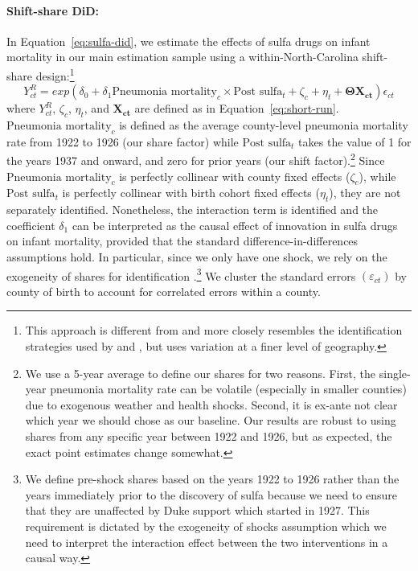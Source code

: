 \documentclass[12pt]{article}
\begin{document}
\paragraph{Shift-share DiD:}
In Equation~\ref{eq:sulfa-did}, we estimate the effects of sulfa drugs on infant mortality in our main estimation sample using a within-North-Carolina shift-share design:\footnote{This approach is different from  and more closely resembles the identification strategies used by  and , but uses variation at a finer level of geography.}
\begin{equation}
    Y^{R}_{ct} = exp(\delta_0 + \delta_1{\text{Pneumonia mortality}_{c} \times \text{Post sulfa}_{t}} + \zeta_c + \eta_t + \boldsymbol{\Theta} \mathbf{X_{ct}})\epsilon_{ct} \label{eq:sulfa-did}
\end{equation}
\noindent where $Y^{R}_{ct}$, $\zeta_c$, $\eta_t$, and $\mathbf{X_{ct}}$ are defined as in Equation~\ref{eq:short-run}.
$\text{Pneumonia mortality}_{c}$ is defined as the average county-level pneumonia mortality rate from 1922 to 1926 (our share factor) while $\text{Post sulfa}_{t}$ takes the value of 1 for the years 1937 and onward, and zero for prior years (our shift factor).\footnote{We use a 5-year average to define our shares for two reasons.
First, the single-year pneumonia mortality rate can be volatile (especially in smaller counties) due to exogenous weather and health shocks.
Second, it is ex-ante not clear which year we should chose as our baseline.
Our results are robust to using shares from any specific year between 1922 and 1926, but as expected, the exact point estimates change somewhat.} Since $\text{Pneumonia mortality}_{c}$ is perfectly collinear with county fixed effects ($\zeta_c$), while $\text{Post sulfa}_{t}$ is perfectly collinear with birth cohort fixed effects ($\eta_t$), they are not separately identified.
Nonetheless, the interaction term is identified and the coefficient $\delta_1$ can be interpreted as the causal effect of innovation in sulfa drugs on infant mortality, provided that the standard difference-in-differences assumptions hold.
In particular, since we only have one shock, we rely on the exogeneity of shares for identification .\footnote{
We define pre-shock shares based on the years 1922 to 1926 rather than the years immediately prior to the discovery of sulfa because we need to ensure that they are unaffected by Duke support which started in 1927.
This requirement is dictated by the exogeneity of shocks assumption which we need to interpret the interaction effect between the two interventions in a causal way.
}
We cluster the standard errors $(\varepsilon_{ct})$ by county of birth to account for correlated errors within a county.
\end{document}
